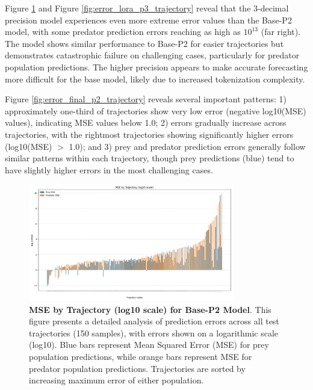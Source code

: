 \documentclass{article}
\begin{document}
Figure \ref{fig:error_lora_p2_trajectory} and Figure \ref{fig:error_lora_p3_trajectory} reveal that the 3-decimal precision model experiences even more extreme error values than the Base-P2 model, with some predator prediction errors reaching as high as $10^{13}$ (far right). The model shows similar performance to Base-P2 for easier trajectories but demonstrates catastrophic failure on challenging cases, particularly for predator population predictions. The higher precision appears to make accurate forecasting more difficult for the base model, likely due to increased tokenization complexity.

Figure \ref{fig:error_final_p2_trajectory} reveals several important patterns: 1) approximately one-third of trajectories show very low error (negative log10(MSE) values), indicating MSE values below 1.0; 2) errors gradually increase across trajectories, with the rightmost trajectories showing significantly higher errors (log10(MSE) $>$ 1.0); and 3) prey and predator prediction errors generally follow similar patterns within each trajectory, though prey predictions (blue) tend to have slightly higher errors in the most challenging cases.


\begin{figure} [H]
    \centering
    \includegraphics[width=0.8\textwidth]{trajectory_errors_p2}
    \caption{\textbf{MSE by Trajectory (log10 scale) for Base-P2 Model}. This figure presents a detailed analysis of prediction errors across all test trajectories (150 samples), with errors shown on a logarithmic scale (log10). Blue bars represent Mean Squared Error (MSE) for prey population predictions, while orange bars represent MSE for predator population predictions. Trajectories are sorted by increasing maximum error of either population.}
    \label{fig:error_lora_p2_trajectory}
\end{figure}
\end{document}
